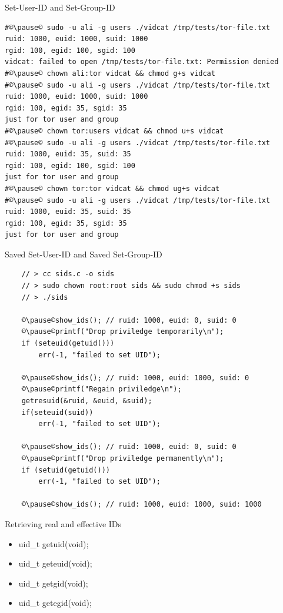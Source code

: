\documentclass[xcolor={rgb}]{beamer}
\newcommand{\pitem}{\pause\item}
\begin{document}
	\begin{frame}[fragile]{Set-User-ID and Set-Group-ID}
		\begin{verbatim}
#©\pause© sudo -u ali -g users ./vidcat /tmp/tests/tor-file.txt
ruid: 1000, euid: 1000, suid: 1000
rgid: 100, egid: 100, sgid: 100
vidcat: failed to open /tmp/tests/tor-file.txt: Permission denied
#©\pause© chown ali:tor vidcat && chmod g+s vidcat
#©\pause© sudo -u ali -g users ./vidcat /tmp/tests/tor-file.txt
ruid: 1000, euid: 1000, suid: 1000
rgid: 100, egid: 35, sgid: 35
just for tor user and group
#©\pause© chown tor:users vidcat && chmod u+s vidcat
#©\pause© sudo -u ali -g users ./vidcat /tmp/tests/tor-file.txt
ruid: 1000, euid: 35, suid: 35
rgid: 100, egid: 100, sgid: 100
just for tor user and group
#©\pause© chown tor:tor vidcat && chmod ug+s vidcat
#©\pause© sudo -u ali -g users ./vidcat /tmp/tests/tor-file.txt
ruid: 1000, euid: 35, suid: 35
rgid: 100, egid: 35, sgid: 35
just for tor user and group
		\end{verbatim}
	\end{frame}


	\begin{frame}[fragile]{Saved Set-User-ID and Saved Set-Group-ID}
		\begin{verbatim}
    // > cc sids.c -o sids
    // > sudo chown root:root sids && sudo chmod +s sids
    // > ./sids

    ©\pause©show_ids(); // ruid: 1000, euid: 0, suid: 0
    ©\pause©printf("Drop priviledge temporarily\n");
    if (seteuid(getuid()))
        err(-1, "failed to set UID");
    
    ©\pause©show_ids(); // ruid: 1000, euid: 1000, suid: 0
    ©\pause©printf("Regain priviledge\n");
    getresuid(&ruid, &euid, &suid);
    if(seteuid(suid))
        err(-1, "failed to set UID");

    ©\pause©show_ids(); // ruid: 1000, euid: 0, suid: 0
    ©\pause©printf("Drop priviledge permanently\n");
    if (setuid(getuid()))
        err(-1, "failed to set UID");

    ©\pause©show_ids(); // ruid: 1000, euid: 1000, suid: 1000
		\end{verbatim}
	\end{frame}

	\begin{frame}[fragile]{Retrieving real and effective IDs}
	\begin{itemize}
		\pitem uid\_t getuid(void);
		\pitem uid\_t geteuid(void);
		\pitem uid\_t getgid(void);
		\pitem uid\_t getegid(void);
	\end{itemize}
	\end{frame}
\end{document}
